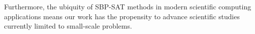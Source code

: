 Furthermore, the ubiquity of SBP-SAT methods in modern scientific computing applications means our work has the propensity to advance scientific studies currently limited to small-scale problems.





